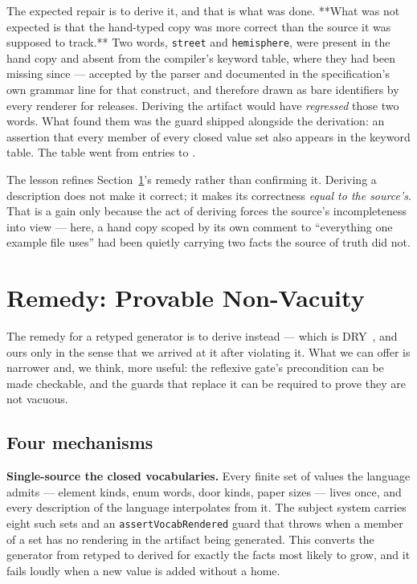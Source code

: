 \documentclass[10pt,journal,compsoc]{IEEEtran}
\begin{document}
The expected repair is to derive it, and that is what was done. **What was not expected is that the
hand-typed copy was more correct than the source it was supposed to track.** Two words, \texttt{street}
and \texttt{hemisphere}, were present in the hand copy and absent from the compiler's keyword
table, where they had been missing since \factUntabledSince{} --- accepted by the parser and
documented in the specification's own grammar line for that construct, and therefore drawn as bare
identifiers by every renderer for \factUntabledReleases{} releases. Deriving the artifact would
have \emph{regressed} those two words. What found them was the guard shipped alongside the
derivation: an assertion that every member of every closed value set also appears in the keyword
table. The table went from \factKeywordsBefore{} entries to \factKeywordsAfter{}.

The lesson refines Section~\ref{sec:remedy}'s remedy rather than confirming it. Deriving a
description does not make it correct; it makes its correctness \emph{equal to the source's}. That
is a gain only because the act of deriving forces the source's incompleteness into view --- here,
a hand copy scoped by its own comment to ``everything one example file uses'' had been quietly
carrying two facts the source of truth did not.

\section{Remedy: Provable Non-Vacuity}\label{sec:remedy}

The remedy for a retyped generator is to derive instead --- which is
DRY~\cite{hunt1999pragmatic}, and ours only in the sense that we arrived at it after
violating it. What we can offer is narrower and, we think, more useful: the reflexive
gate's precondition can be made checkable, and the guards that replace it can be
required to prove they are not vacuous.

\subsection{Four mechanisms}

\textbf{Single-source the closed vocabularies.} Every finite set of values the language
admits --- element kinds, enum words, door kinds, paper sizes --- lives once, and every
description of the language interpolates from it. The subject system carries eight such
sets and an \texttt{assertVocabRendered} guard that throws when a member of a set has no
rendering in the artifact being generated. This converts the generator from retyped to
derived for exactly the facts most likely to grow, and it fails loudly when a new value
is added without a home.
\end{document}
